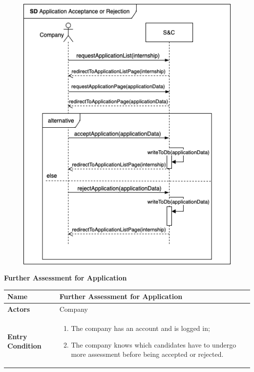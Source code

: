 \begin{enumerate}[label=\textbf{[US\arabic*]}, left = 0pt, align = left, resume]
            \newpage
            \begin{figure}[h!]
                \centering  \includegraphics{RASD/Images/UseCases/ApplicationAcceptanceRejection.drawio.png}
                \label{fig:example}
            \end{figure}

            \newpage
            \item \textbf{Further Assessment for Application}
            
            \begin{longtable}{|l|p{11cm}|}  
                \hline
                \textbf{Name} & 
                    \textbf{Further Assessment for Application} \\
                \hline
                
                \textbf{Actors} & 
                    Company\\
                \hline
                
                \textbf{Entry Condition} & 
                    \begin{enumerate}[label=\textbullet, itemsep=0em]
                        \item The company has an account and is logged in;
                        \item The company knows which candidates have to undergo more assessment before being accepted or rejected.
                    \end{enumerate} \\
                \hline
                

\end{longtable}
\end{enumerate}
